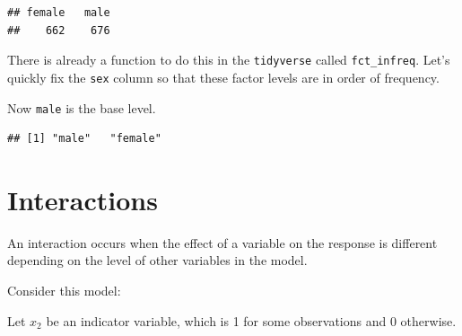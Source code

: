 \documentclass[openany]{book}
\newenvironment{Shaded}{\begin{snugshade}}{\end{snugshade}}
\newcommand{\DataTypeTok}[1]{\textcolor[rgb]{0.13,0.29,0.53}{#1}}
\newcommand{\KeywordTok}[1]{\textcolor[rgb]{0.13,0.29,0.53}{\textbf{#1}}}
\newcommand{\NormalTok}[1]{#1}
\newcommand{\OperatorTok}[1]{\textcolor[rgb]{0.81,0.36,0.00}{\textbf{#1}}}
\newcommand{\StringTok}[1]{\textcolor[rgb]{0.31,0.60,0.02}{#1}}
\begin{document}
\begin{Shaded}
\end{Shaded}

\begin{verbatim}
## female   male 
##    662    676
\end{verbatim}

There is already a function to do this in the \texttt{tidyverse} called \texttt{fct\_infreq}. Let's quickly fix the \texttt{sex} column so that these factor levels are in order of frequency.

\begin{Shaded}
\end{Shaded}

Now \texttt{male} is the base level.

\begin{Shaded}
\end{Shaded}

\begin{verbatim}
## [1] "male"   "female"
\end{verbatim}

\hypertarget{interactions}{%
\section{Interactions}\label{interactions}}

An interaction occurs when the effect of a variable on the response is different depending on the level of other variables in the model.

Consider this model:

Let \(x_2\) be an indicator variable, which is 1 for some observations and 0 otherwise.
\end{document}
